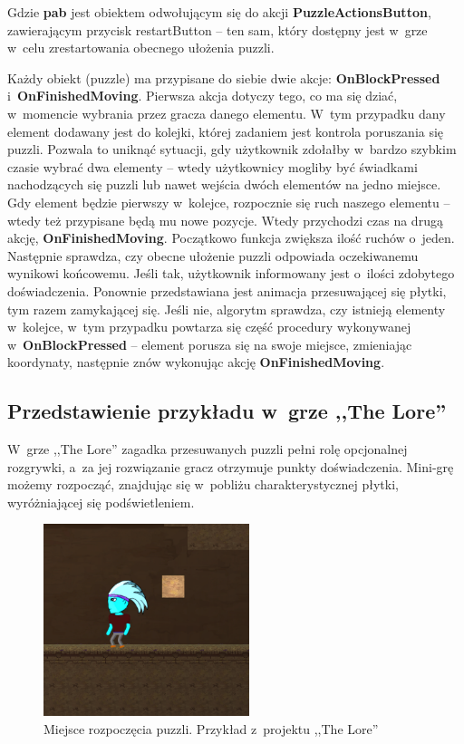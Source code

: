 \documentclass[oneside,polski,logo]{amuthesis}
\begin{document}
Gdzie \textbf{pab} jest obiektem odwołującym się do akcji \textbf{PuzzleActionsButton}, zawierającym przycisk restartButton – ten sam, który dostępny jest w~grze w~celu zrestartowania obecnego ułożenia puzzli.

Każdy obiekt (puzzle) ma przypisane do siebie dwie akcje: \textbf{OnBlockPressed} i~\textbf{OnFinishedMoving}. Pierwsza akcja dotyczy tego, co ma się dziać, w~momencie wybrania przez gracza danego elementu. W~tym przypadku dany element dodawany jest do kolejki, której zadaniem jest kontrola poruszania się puzzli. Pozwala to uniknąć sytuacji, gdy użytkownik zdołałby w~bardzo szybkim czasie wybrać dwa elementy – wtedy użytkownicy mogliby być świadkami nachodzących się puzzli lub nawet wejścia dwóch elementów na jedno miejsce. Gdy element będzie pierwszy w~kolejce, rozpocznie się ruch naszego elementu – wtedy też przypisane będą mu nowe pozycje. Wtedy przychodzi czas na drugą akcję, \textbf{OnFinishedMoving}. Początkowo funkcja zwiększa ilość ruchów o~jeden. Następnie sprawdza, czy obecne ułożenie puzzli odpowiada oczekiwanemu wynikowi końcowemu. Jeśli tak, użytkownik informowany jest o~ilości zdobytego doświadczenia. Ponownie przedstawiana jest animacja przesuwającej się płytki, tym razem zamykającej się. Jeśli nie, algorytm sprawdza, czy istnieją elementy w~kolejce, w~tym przypadku powtarza się część procedury wykonywanej w~\textbf{OnBlockPressed} – element porusza się na swoje miejsce, zmieniając koordynaty, następnie znów wykonując akcję \textbf{OnFinishedMoving}.

\subsection{Przedstawienie przykładu w~grze ,,The Lore''}
\par W~grze ,,The Lore'' zagadka przesuwanych puzzli pełni rolę opcjonalnej rozgrywki, a~za jej rozwiązanie gracz otrzymuje punkty doświadczenia. Mini-grę możemy rozpocząć, znajdując się w~pobliżu charakterystycznej płytki, wyróżniającej się podświetleniem.\begin{figure}[h]
	\centering
	\includegraphics[width=6cm]{images/tyrek/the_lore_puzzle_lvl1.png}
	\caption{Miejsce rozpoczęcia puzzli. Przykład z~projektu ,,The Lore''}
\end{figure}
\end{document}
